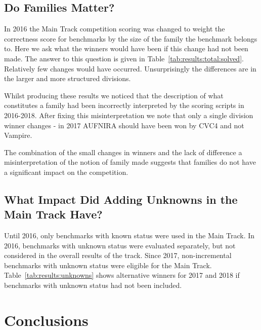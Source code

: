 \documentclass[dvipsnames,table,twoside,11pt]{article}
\newcommand{\maintrack}{Main Track\xspace}
\begin{document}


\subsection{Do Families Matter?}

In 2016 the \maintrack competition scoring was changed to weight the correctness score for benchmarks by the size of the family the benchmark belongs to. Here we ask what the winners would have been if this change had not been made. The answer to this question is given in Table~\ref{tab:results:total:solved}. Relatively few changes would have occurred. Unsurprisingly the differences are in the larger and more structured divisions.

Whilst producing these results we noticed that the description of what constitutes a family had been incorrectly interpreted by the scoring scripts in 2016-2018. After fixing this misinterpretation we note that only a single division winner changes - in 2017 AUFNIRA should have been won by CVC4 and not Vampire.

The combination of the small changes in winners and the lack of difference a misinterpretation of the notion of family made suggests that families do not have a significant impact on the competition.


\subsection{What Impact Did Adding Unknowns in the \maintrack Have?}

Until 2016, only benchmarks with known status were used in the \maintrack. In
2016, benchmarks with unknown status were evaluated separately, but not
considered in the overall results of the track.  Since 2017, non-incremental
benchmarks with unknown status were eligible for the \maintrack.
Table~\ref{tab:results:unknowns} shows alternative winners for 2017 and 2018 if
benchmarks with unknown status had not been included.





\section{Conclusions}
\label{sec:conclusions}
\end{document}
